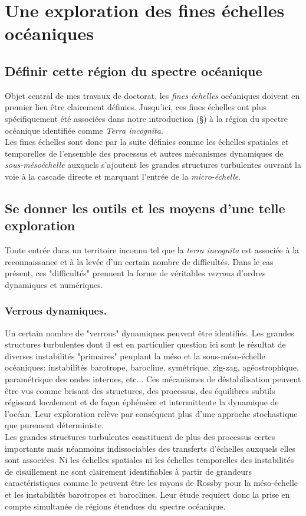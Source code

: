 \color{black}

\color{blue}
\section{Une exploration des fines échelles océaniques}
\subsection{Définir cette région du spectre océanique}
Objet central de mes travaux de doctorat, les \textit{fines échelles} océaniques doivent en premier lieu être clairement définies. Jusqu'ici, ces fines échelles ont plus spécifiquement été associées dans notre introduction (\S {}) à la région du spectre océanique identifiée comme \textit{Terra incognita}.\\
Les fines échelles sont donc par la suite définies comme les échelles spatiales et temporelles de l'ensemble des processus et autres mécanismes dynamiques de \textit{sous-mésoéchelle} \citep{mcwilliams_submesoscale_2016} auxquels s'ajoutent les grandes structures turbulentes ouvrant la voie à la cascade directe et marquant l'entrée de la \textit{micro-échelle}.
 \color{black}

\subsection{Se donner les outils et les moyens d'une telle exploration}
\color{blue}
Toute entrée dans un territoire inconnu tel que la \textit{terra incognita} est associée à la reconnaissance et à la levée d'un certain nombre de difficultés. Dans le cas présent, ces "difficultés" prennent la forme de véritables \textit{verrous} d'ordres dynamiques et numériques.
\subsubsection{Verrous dynamiques.}
Un certain nombre de "verrous" dynamiques peuvent être identifiés. Les grandes structures turbulentes dont il est en particulier question ici sont le résultat de diverses instabilités "primaires" peuplant la méso et la sous-méso-échelle océaniques: instabilités barotrope, barocline, symétrique, zig-zag, agéostrophique, paramétrique des ondes internes, etc... Ces mécanismes de déstabilisation peuvent être vus comme brisant des structures, des processus, des équilibres subtils régissant localement et de façon éphémère et intermittente la dynamique de l'océan. Leur exploration relève par conséquent plus d'une approche stochastique que purement déterministe.\\
Les grandes structures turbulentes constituent de plus des processus certes importants mais néanmoins indissociables des transferts d'échelles auxquels elles sont associées. Ni les échelles spatiales ni les échelles temporelles des instabilités de cisaillement ne sont clairement identifiables à partir de grandeurs caractéristiques comme le peuvent être les rayons de Rossby pour la méso-échelle et les instabilités barotropes et baroclines. Leur étude requiert donc la prise en compte simultanée de régions étendues du spectre océanique.\\

